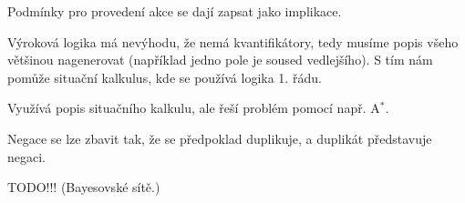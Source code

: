 \documentclass[12pt]{article}					%
\begin{document}
\begin{definice}
	Podmínky pro provedení akce se dají zapsat jako implikace.
\end{definice}

\begin{definice}
	Výroková logika má nevýhodu, že nemá kvantifikátory, tedy musíme popis všeho většinou nagenerovat (například jedno pole je soused vedlejšího). S tím nám pomůže situační kalkulus, kde se používá logika 1. řádu.
\end{definice}

\begin{definice}
	Využívá popis situačního kalkulu, ale řeší problém pomocí např. A$^*$.
\end{definice}

\begin{poznamka}
	Negace se lze zbavit tak, že se předpoklad duplikuje, a duplikát představuje negaci.
\end{poznamka}


TODO!!! (Bayesovské sítě.)
\end{document}
